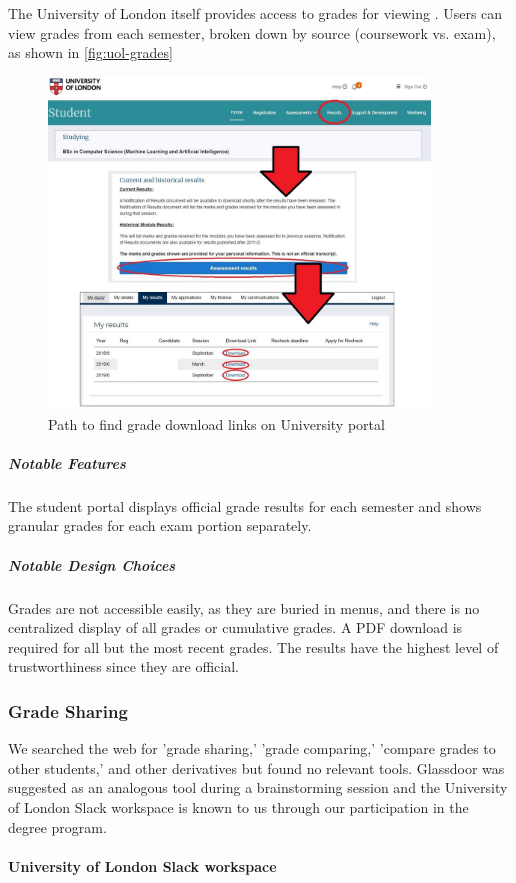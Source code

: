 The University of London itself provides access to grades for viewing \cite{uol}. Users can view grades from each semester, broken down by source (coursework vs. exam), as shown in \autoref{fig:uol-grades}

\begin{figure}[H]
\noindent \includegraphics[height=250pt]{uol-buried}
\centering
\caption{Path to find grade download links on University portal}
\label{fig:uol-grades}
\end{figure}

\subparagraph{Notable Features}
The student portal displays official grade results for each semester and shows granular grades for each exam portion separately.

\subparagraph{Notable Design Choices}
Grades are not accessible easily, as they are buried in menus, and there is no centralized display of all grades or cumulative grades. A PDF download is required for all but the most recent grades. The results have the highest level of trustworthiness since they are official.

\subsubsection{Grade Sharing}

We searched the web for 'grade sharing,' 'grade comparing,' 'compare grades to other students,' and other derivatives but found no relevant tools. Glassdoor was suggested as an analogous tool during a brainstorming session and the University of London Slack workspace is known to us through our participation in the degree program.

\paragraph{University of London Slack workspace}

